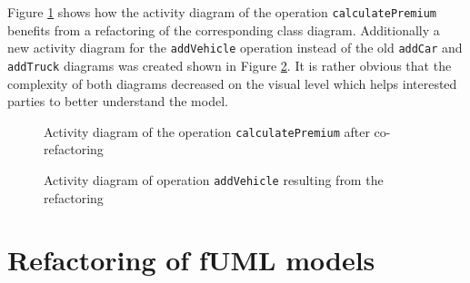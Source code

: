 \documentclass{llncs}
\begin{document}
Figure \ref{fig:calculatePremiumRef} shows how the activity diagram of the operation \texttt{calculatePremium} benefits from a refactoring of the corresponding 
class diagram. Additionally a new activity diagram for the \texttt{addVehicle} operation instead of the old 
\texttt{addCar} and \texttt{addTruck} diagrams was created shown in Figure \ref{fig:addCarRef}. It is rather obvious 
that the complexity of both diagrams decreased on the visual level which helps interested parties to better understand the 
model.

\begin{figure}[h!t]
 \centering
 \caption{Activity diagram of the operation \texttt{calculatePremium} after co-refactoring}
 \label{fig:calculatePremiumRef}
\end{figure}

\begin{figure}[h!t]
 \centering
 \caption{Activity diagram of operation \texttt{addVehicle} resulting from the refactoring}
 \label{fig:addCarRef}
\end{figure}

\clearpage
\section{Refactoring of fUML models}
\label{sec:fuml-refactoring}
\end{document}
